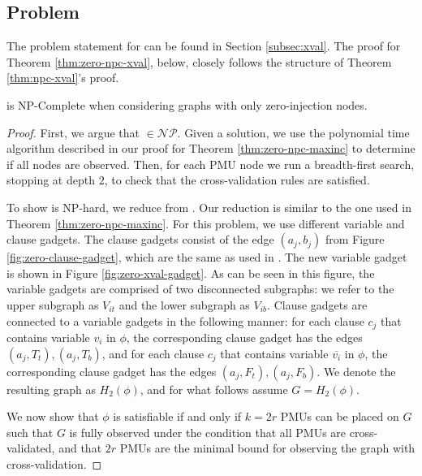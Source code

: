 \subsection{\xval Problem}
\label{subsec:zero-xval}

The problem statement for \xval can be found in Section \ref{subsec:xval}.  The proof for Theorem \ref{thm:zero-npc-xval}, below, closely follows the structure of Theorem \ref{thm:npc-xval}'s proof.

\begin{theorem}
\xval is NP-Complete when considering graphs with only zero-injection nodes.   %
\label{thm:zero-npc-xval}
\end{theorem}


\begin{proof}
First, we argue that \xval $\in \mathcal{NP}$.  Given a \xval solution, we use
the polynomial time algorithm described in our proof for Theorem
\ref{thm:zero-npc-maxinc} to determine if all nodes are observed.  Then, for each
PMU node we run a breadth-first search, stopping at depth $2$, to check that
the cross-validation rules are satisfied.

To show \xval is NP-hard, we reduce from \sats.  Our reduction is similar to
the one used in Theorem \ref{thm:zero-npc-maxinc}.  
For this problem, we use different variable and clause gadgets. The clause gadgets consist of the edge $(a_j, b_j)$ from Figure \ref{fig:zero-clause-gadget},
which are the same as used in \cite{Brueni05}. The new variable gadget is shown in Figure
\ref{fig:zero-xval-gadget}. As can be seen in this figure, the variable gadgets are comprised of two disconnected
subgraphs: we refer to the upper subgraph as $V_{it}$ and the
lower subgraph as $V_{ib}$. Clause gadgets are connected to a variable gadgets in the following manner: 
for each clause $c_j$ that contains variable $v_i$ in $\phi$, the corresponding clause gadget has the edges $(a_j, T_t), (a_j,
T_b)$, and for each clause $c_j$ that contains variable $\overline{v_i}$ in
$\phi$, the corresponding clause gadget has the edges $(a_j, F_t), (a_j,
F_b)$. We denote the resulting graph as $H_2(\phi)$, and for what follows assume $G=H_2(\phi)$.

We now show that $\phi$ is satisfiable if and only if
$k=2r$ PMUs can be placed on $G$ such that $G$ is fully observed under the
condition that all PMUs are cross-validated, and that $2r$ PMUs are the minimal 
bound for observing the graph with cross-validation.


\end{proof}
